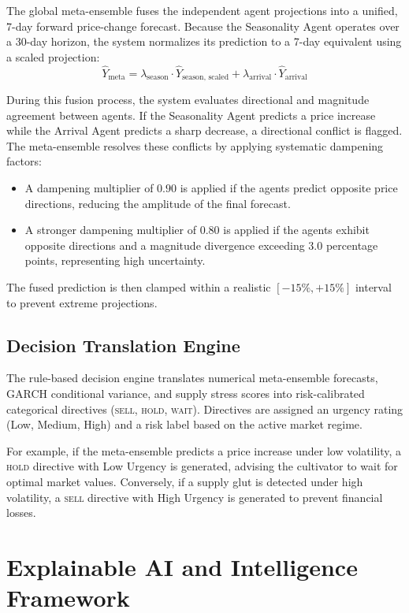 \documentclass[12pt,a4paper]{report}
\theoremstyle{definition}
\theoremstyle{remark}
\begin{document}
The global meta-ensemble fuses the independent agent projections into a unified, 7-day forward price-change forecast. Because the Seasonality Agent operates over a 30-day horizon, the system normalizes its prediction to a 7-day equivalent using a scaled projection:
\begin{equation}
    \hat{Y}_{\text{meta}} = \lambda_{\text{season}} \cdot \hat{Y}_{\text{season, scaled}} + \lambda_{\text{arrival}} \cdot \hat{Y}_{\text{arrival}}
\end{equation}

During this fusion process, the system evaluates directional and magnitude agreement between agents. If the Seasonality Agent predicts a price increase while the Arrival Agent predicts a sharp decrease, a directional conflict is flagged. The meta-ensemble resolves these conflicts by applying systematic dampening factors:
\begin{itemize}
    \item A dampening multiplier of $0.90$ is applied if the agents predict opposite price directions, reducing the amplitude of the final forecast.
    \item A stronger dampening multiplier of $0.80$ is applied if the agents exhibit opposite directions and a magnitude divergence exceeding $3.0$ percentage points, representing high uncertainty.
\end{itemize}
The fused prediction is then clamped within a realistic $[-15\%, +15\%]$ interval to prevent extreme projections.

\subsection{Decision Translation Engine}

The rule-based decision engine translates numerical meta-ensemble forecasts, GARCH conditional variance, and supply stress scores into risk-calibrated categorical directives (\textsc{sell}, \textsc{hold}, \textsc{wait}). Directives are assigned an urgency rating (Low, Medium, High) and a risk label based on the active market regime. 

For example, if the meta-ensemble predicts a price increase under low volatility, a \textsc{hold} directive with Low Urgency is generated, advising the cultivator to wait for optimal market values. Conversely, if a supply glut is detected under high volatility, a \textsc{sell} directive with High Urgency is generated to prevent financial losses.

\section{Explainable AI and Intelligence Framework}
\end{document}
